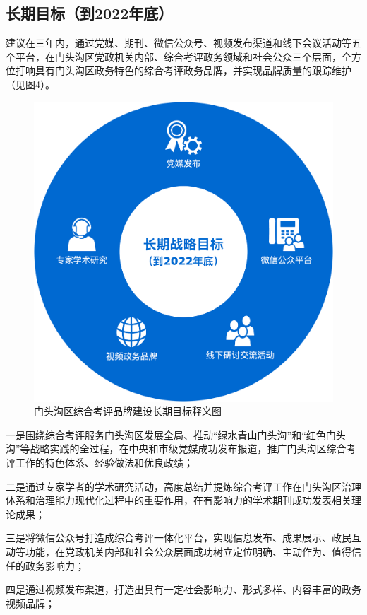 \documentclass[12pt]{article} %
\begin{document}
\subsection{长期目标（到2022年底）}
建议在三年内，通过党媒、期刊、微信公众号、视频发布渠道和线下会议活动等五个平台，在门头沟区党政机关内部、综合考评政务领域和社会公众三个层面，全方位打响具有门头沟区政务特色的综合考评政务品牌，并实现品牌质量的跟踪维护（见图4）。
\begin{figure}[ht]
\centering
\includegraphics[width=\textwidth]{figures/4.png}
\caption{门头沟区综合考评品牌建设长期目标释义图}
\label{fig:fig1}
\end{figure}

一是围绕综合考评服务门头沟区发展全局、推动“绿水青山门头沟”和“红色门头沟”等战略实践的全过程，在中央和市级党媒成功发布报道，推广门头沟区综合考评工作的特色体系、经验做法和优良政绩；

二是通过专家学者的学术研究活动，高度总结并提炼综合考评工作在门头沟区治理体系和治理能力现代化过程中的重要作用，在有影响力的学术期刊成功发表相关理论成果；

三是将微信公众号打造成综合考评一体化平台，实现信息发布、成果展示、政民互动等功能，在党政机关内部和社会公众层面成功树立定位明确、主动作为、值得信任的政务影响力；

四是通过视频发布渠道，打造出具有一定社会影响力、形式多样、内容丰富的政务视频品牌；
\end{document}

